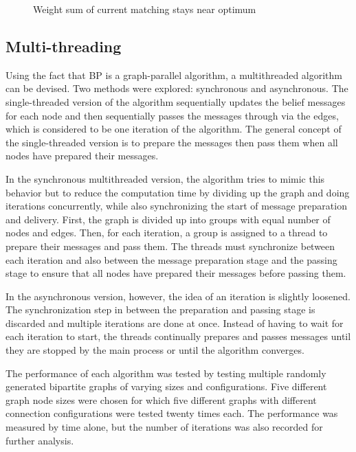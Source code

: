 \begin{figure}
\centering
\caption{Weight sum of current matching stays near optimum}
\label{fig:sum_v_iter}
\end{figure}

\subsection{Multi-threading}
Using the fact that BP is a graph-parallel algorithm, a multithreaded algorithm can be devised. Two methods were explored: synchronous and asynchronous. The single-threaded version of the algorithm sequentially updates the belief messages for each node and then sequentially passes the messages through via the edges, which is considered to be one iteration of the algorithm. The general concept of the single-threaded version is to prepare the messages then pass them when all nodes have prepared their messages. 

In the synchronous multithreaded version, the algorithm tries to mimic this behavior but to reduce the computation time by dividing up the graph and doing iterations concurrently, while also synchronizing the start of message preparation and delivery. First, the graph is divided up into groups with equal number of nodes and edges. Then, for each iteration, a group is assigned to a thread to prepare their messages and pass them. The threads must synchronize between each iteration and also between the message preparation stage and the passing stage to ensure that all nodes have prepared their messages before passing them.

In the asynchronous version, however, the idea of an iteration is slightly loosened. The synchronization step in between the preparation and passing stage is discarded and multiple iterations are done at once. Instead of having to wait for each iteration to start, the threads continually prepares and passes messages until they are stopped by the main process or until the algorithm converges.

The performance of each algorithm was tested by testing multiple randomly generated bipartite graphs of varying sizes and configurations. Five different graph node sizes were chosen for which five different graphs with different connection configurations were tested twenty times each. The performance was measured by time alone, but the number of iterations was also recorded for further analysis.

